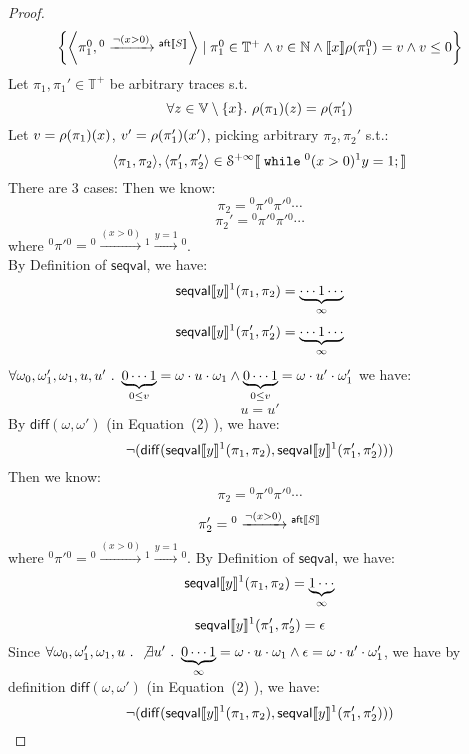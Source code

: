 \begin{example}
\begin{proof}
\begin{equation}
\begin{array}{ll}
 \left\{ \left< \pi_1^0, {}^0 \xrightarrow{\neg(x > 0)} {}^{\mathsf{aft}\sem{S}} \right> 
 \mid \pi_1^0 \in \mathbb{T^{+}} \land v \in \mathbb{N} \land
  \sem{x}\env(\pi_1^0) = v
 \land v \leq 0 \right\}
 \end{array} 
 \end{equation}
 Let $\pi_1, \pi_1' \in \mathbb{T^{+}}$ be arbitrary traces s.t. 
 $$\forall z \in \mathbb{V}\setminus \{x\}. ~ \rho(\pi_1)(z) = \rho(\pi_1') $$ 
 Let $v = \rho(\pi_1)(x) $, $v' = \rho(\pi'_1)(x')$, picking arbitrary $\pi_2, \pi_2'$ s.t.:
 \[
 	\left< \pi_1, \pi_2 \right>,  \left< \pi'_1, \pi'_2 \right> \in \mathcal{S}^{+\infty}\sem{\ewhile {}^0 (x > 0) {}^1 y = 1; }
 \]
 There are 3 cases:
 Then we know:
 \[
 \pi_2 = {}^0 \pi' {}^0 \pi' {}^0\cdots 
\]
%
\[ 
 \pi_2' = {}^0 \pi' {}^0 \pi' {}^0\cdots 
 \]
 where ${}^0 \pi' {}^0 = {}^0 \xrightarrow{(x > 0)} {}^1 \xrightarrow{y = 1} {}^0$.
 \\
 By Definition of $\mathsf{seqval}$, we have:
 \[
  \mathsf{seqval}\llbracket y \rrbracket{}^1(\pi_1, \pi_2 ) =  \underbrace{ \cdots 1 \cdots}_{\infty}
 \]
 \[
  \mathsf{seqval}\llbracket y \rrbracket{}^1(\pi_1', \pi_2' ) =  \underbrace{\cdots 1  \cdots}_{\infty}
 \]
  $\forall \omega_0, \omega_1', \omega_1, u, u' ~.~ 
  \underbrace{0 \cdots 1}_{0 \leq v} = \omega \cdot u \cdot \omega_1 
  \land \underbrace{0 \cdots 1}_{0 \leq v} = \omega \cdot u' \cdot \omega_1'$ we have:
 \[
  u = u'
 \]
 By $\mathsf{diff}(\omega, \omega')$ (in \cite{cousot2019abstract} Equation~(2) ), we have:
 \[
  \neg(\mathsf{diff}(\mathsf{seqval}\llbracket y \rrbracket{}^1(\pi_1, \pi_2 ), \mathsf{seqval}\llbracket y \rrbracket{}^1(\pi_1', \pi_2' )))
 \]
 Then we know:
  \[
  \pi_2 = {}^0 \pi' {}^0 \pi' {}^0 \cdots 
  \]
  \[
  \pi_2' = {}^0 \xrightarrow{\neg(x > 0)} {}^{\mathsf{aft}\llbracket S \rrbracket}
  \]
 where ${}^0 \pi' {}^0 = {}^0 \xrightarrow{(x > 0)} {}^1 \xrightarrow{y = 1} {}^0$.
 By Definition of $\mathsf{seqval}$, we have:
 \[
  \mathsf{seqval}\llbracket y \rrbracket{}^1(\pi_1, \pi_2 ) = \underbrace{1 \cdots}_{\infty}
 \]
 \[
  \mathsf{seqval}\llbracket y \rrbracket{}^1(\pi'_1, \pi_2' ) = \epsilon
 \]
 Since $\forall \omega_0, \omega_1', \omega_1, u~.~ \not\exists u' ~.~ 
  \underbrace{0 \cdots 1}_{\infty} = \omega \cdot u \cdot \omega_1 
  \land \epsilon = \omega \cdot u' \cdot \omega_1'$,
 we have by definition $\mathsf{diff}(\omega, \omega')$ (in \cite{cousot2019abstract} Equation~(2) ), we have:
 \[
  \neg(\mathsf{diff}(\mathsf{seqval}\llbracket y \rrbracket{}^1(\pi_1, \pi_2 ), \mathsf{seqval}\llbracket y \rrbracket{}^1(\pi_1', \pi_2' )))
\]
\end{proof}
\end{example}
